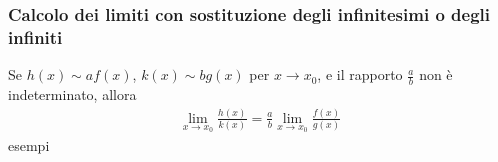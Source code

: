 \documentclass[letterpaper,10pt,italian]{jupyterBook}
\begin{document}
\subsubsection{Calcolo dei limiti con sostituzione degli infinitesimi o degli infiniti}
\label{\detokenize{ch/infinitesimal_calculus/analysis:calcolo-dei-limiti-con-sostituzione-degli-infinitesimi-o-degli-infiniti}}
\sphinxAtStartPar
Se \(h(x) \sim a f(x)\), \(k(x) \sim b g(x)\) per \(x \rightarrow x_0\), e il rapporto \(\frac{a}{b}\) non è indeterminato, allora
\begin{equation*}
\begin{split}\lim_{x \rightarrow x_0} \frac{h(x)}{k(x)} = \frac{a}{b} \lim_{x \rightarrow x_0} \frac{f(x)}{g(x)}\end{split}
\end{equation*}
\sphinxAtStartPar
{} esempi
\end{document}
